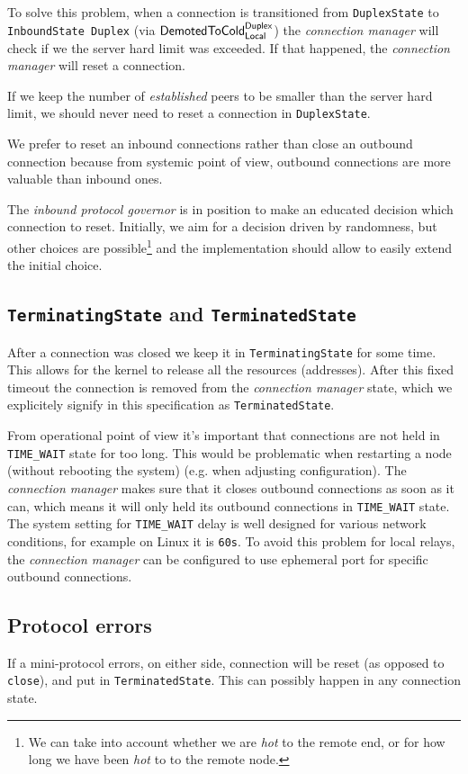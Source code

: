 \documentclass{article}
\def\DuplexState{\texttt{DuplexState}}
\def\InboundStateDup{\texttt{InboundState Duplex}}
\def\TerminatingState{\texttt{TerminatingState}}
\def\TerminatedState{\texttt{TerminatedState}}
\def\DemotedToColdDupLoc{$\text{\textsf{DemotedToCold}}^\text{\textsf{Duplex}}_\text{\textsf{Local}}$}
\def\hot{\textit{hot}}
\def\established{\textit{established}}
\def\connmngr{\textit{connection manager}}
\begin{document}
To solve this problem, when a connection is transitioned from 
\DuplexState{} to \InboundStateDup{} (via \DemotedToColdDupLoc{}) the
\connmngr{} will check if we the server hard limit was exceeded.  If that
happened, the \connmngr{} will reset a connection.

If we keep the number of \established{} peers to be smaller than the server
hard limit, we should never need to reset a connection in \DuplexState{}.

We prefer to reset an inbound connections rather than close an outbound
connection because from systemic point of view, outbound connections are more
valuable than inbound ones.

The \textit{inbound protocol governor} is in position to make an educated
decision which connection to reset.  Initially, we aim for a decision driven by
randomness, but other choices are possible\footnote{We can take into account
whether we are \hot{} to the remote end, or for how long we have been \hot{} to
to the remote node.} and the implementation should allow to easily extend the
initial choice.

\subsection{\TerminatingState{} and \TerminatedState{}}
After a connection was closed we keep it in \TerminatingState{} for some time.
This allows for the kernel to release all the resources (addresses).  After
this fixed timeout the connection is removed from the \connmngr{} state,
which we explicitely signify in this specification as \TerminatedState{}.

From operational point of view it's important that connections are not held in
\texttt{TIME\_WAIT} state for too long.  This would be problematic when
restarting a node (without rebooting the system) (e.g. when adjusting
configuration).  The \connmngr{} makes sure that it closes outbound
connections as soon as it can, which means it will only held its outbound
connections in \texttt{TIME\_WAIT} state.  The system setting for
\texttt{TIME\_WAIT} delay is well designed for various network conditions, for
example on Linux it is \texttt{60s}.  To avoid this problem for local relays,
the \connmngr{} can be configured to use ephemeral port for specific
outbound connections.

\subsection{Protocol errors}
If a mini-protocol errors, on either side, connection will be reset (as opposed
to \texttt{close}), and put in \TerminatedState{}.  This can possibly happen in
any connection state.
\end{document}
